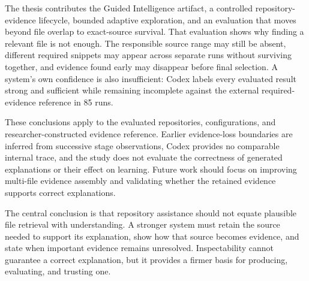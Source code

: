 The thesis contributes the Guided Intelligence artifact, a controlled repository-evidence lifecycle, bounded adaptive exploration, and an evaluation that moves beyond file overlap to exact-source survival. That evaluation shows why finding a relevant file is not enough. The responsible source range may still be absent, different required snippets may appear across separate runs without surviving together, and evidence found early may disappear before final selection. A system's own confidence is also insufficient: Codex labels every evaluated result strong and sufficient while remaining incomplete against the external required-evidence reference in 85 runs.

These conclusions apply to the evaluated repositories, configurations, and researcher-constructed evidence reference. Earlier evidence-loss boundaries are inferred from successive stage observations, Codex provides no comparable internal trace, and the study does not evaluate the correctness of generated explanations or their effect on learning. Future work should focus on improving multi-file evidence assembly and validating whether the retained evidence supports correct explanations.

The central conclusion is that repository assistance should not equate plausible file retrieval with understanding. A stronger system must retain the source needed to support its explanation, show how that source becomes evidence, and state when important evidence remains unresolved. Inspectability cannot guarantee a correct explanation, but it provides a firmer basis for producing, evaluating, and trusting one.
